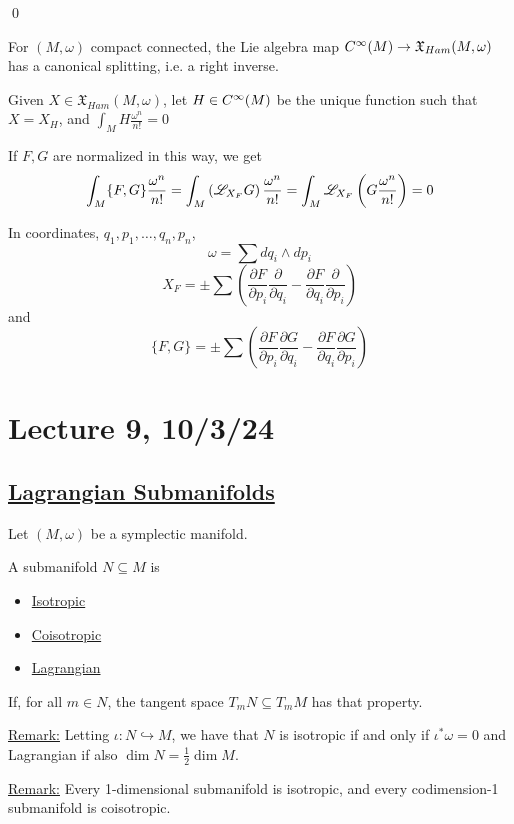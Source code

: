 \documentclass[x11names,reqno,14pt]{extarticle}
\newcommand{\mk}[1]{\mathfrak{#1}}
\newcommand{\pois}[2]{\{#1,#2\}}
\newcommand{\into}{\hookrightarrow}
\newcommand{\pp}[2]{\frac{\partial #1}{\partial #2}}
\begin{document}
\qed

\prop

For $(M,\omega)$ compact connected, the Lie algebra map $C^\oo(M) \to \mk{X}_{Ham}(M,\omega)$ has a canonical splitting, i.e. a right inverse. 

\proof

Given $X \in \mk{X}_{Ham}(M,\omega)$, let $H\in C^\infty(M)$ be the unique function such that $X = X_H$, and $\int_MH\frac{\omega^n}{n!} = 0$

If $F, G$ are normalized in this way, we get
\[
\int_M\pois{F}{G}\frac{\omega^n}{n!} = \int_M\left(\ms{L}_{X_F}G\right)\frac{\omega^n}{n!} = \int_M\ms{L}_{X_F}\left(G\frac{\omega^n}{n!}\right) = 0
\]

In coordinates, $q_1, p_1, \dots, q_n, p_n$, 
\[
\omega = \sum dq_i \wedge dp_i
\]
\[
X_F = \pm \sum\left(\pp{F}{p_i}\pp{}{q_i} - \pp{F}{q_i}\pp{}{p_i}\right)
\]
and
\[
\pois{F}{G} = \pm\sum\left(\pp{F}{p_i}\pp{G}{q_i} - \pp{F}{q_i}\pp{G}{p_i}\right)
\]

\section*{Lecture 9, 10/3/24}

\subsection*{\underline{Lagrangian Submanifolds}}

Let $(M,\omega)$ be a symplectic manifold. 


A submanifold $N\subseteq M$ is 
\begin{itemize}

\item \underline{Isotropic}

\item \underline{Coisotropic}

\item \underline{Lagrangian}

\end{itemize}

If, for all $m \in N$, the tangent space $T_mN\subseteq T_mM$ has that property. 

\underline{Remark:} Letting $\iota:N\into M$, we have that $N$ is isotropic if and only if $\iota^*\omega = 0$ and Lagrangian if also $\dim N = \frac12\dim M$.

\underline{Remark:} Every 1-dimensional submanifold is isotropic, and every codimension-1 submanifold is coisotropic. 
\end{document}
